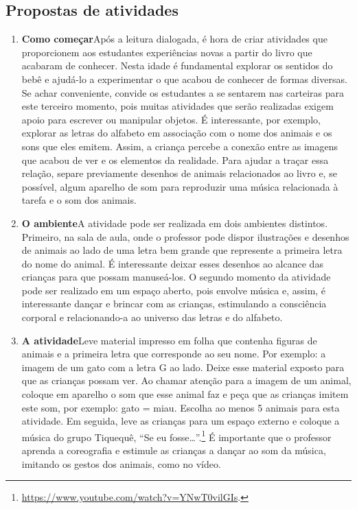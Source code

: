 \documentclass[11pt]{extarticle}
\begin{document}
\subsection{Propostas de atividades}


\begin{enumerate}
\item \textbf{Como começar}\quad Após a leitura dialogada, é hora de criar 
atividades que proporcionem aos estudantes experiências novas a partir do livro 
que acabaram de conhecer. Nesta idade é fundamental explorar os sentidos do bebê e 
ajudá-lo a experimentar o que acabou de conhecer de formas diversas. Se achar 
conveniente, convide os estudantes a se sentarem nas carteiras para este terceiro 
momento, pois muitas atividades que serão realizadas exigem apoio para escrever 
ou manipular objetos. É interessante, por exemplo, explorar as letras do alfabeto em associação com o nome dos animais e os sons que eles emitem.
Assim, a criança percebe a conexão entre as imagens que acabou de ver e os elementos da realidade. Para ajudar a traçar 
essa relação, separe previamente desenhos de animais relacionados ao livro e, se possível, algum aparelho de som para reproduzir uma música relacionada à tarefa e o som dos animais. 

\item \textbf{O ambiente}\quad A atividade pode ser realizada em dois ambientes distintos. Primeiro, na sala de aula, onde o professor pode dispor ilustrações e desenhos de animais ao lado de uma letra bem grande que represente a primeira letra do nome do animal. É interessante deixar esses desenhos ao alcance das crianças para que possam manuseá-los.
O segundo momento da atividade pode ser realizado em um espaço aberto, pois envolve música e, assim, é interessante dançar e brincar com as crianças, estimulando a consciência corporal e relacionando-a ao universo das letras e do alfabeto.

\item \textbf{A atividade}\quad Leve material impresso em folha que contenha figuras de animais e a primeira letra que corresponde ao seu nome. Por exemplo: a imagem de um gato com a letra G ao lado. Deixe esse material exposto para que as crianças possam ver. Ao chamar atenção para a imagem de um animal, coloque em aparelho o som que esse animal faz e peça que as crianças imitem este som, por exemplo: gato = miau. Escolha ao menos 5 animais para esta atividade. Em seguida, leve as crianças para um espaço externo e coloque a música do grupo Tiquequê, ``Se eu fosse\ldots''.\footnote{\url{https://www.youtube.com/watch?v=YNwT0vilGIs}.} É importante que o professor aprenda a coreografia e estimule as crianças a dançar ao som da música, imitando os gestos dos animais, como no vídeo. 


\end{enumerate}
\end{document}
